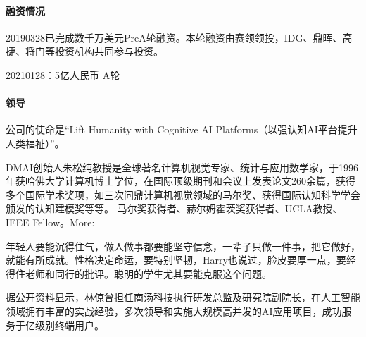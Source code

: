 \documentclass[letterpaper,11pt,english]{sphinxmanual}
\begin{document}
\paragraph{融资情况}
\label{\detokenize{chapter_dive/dm-ai:id5}}

2019\sphinxhyphen{}03\sphinxhyphen{}28已完成数千万美元Pre\sphinxhyphen{}A轮融资。本轮融资由赛领领投，IDG、鼎晖、高捷、将门等投资机构共同参与投资。

2021\sphinxhyphen{}01\sphinxhyphen{}28：5亿人民币 A轮


\paragraph{领导}
\label{\detokenize{chapter_dive/dm-ai:id6}}
公司的使命是“Lift Humanity with Cognitive AI
Platforms（以强认知AI平台提升人类福祉）”。

DMAI创始人朱松纯教授是全球著名计算机视觉专家、统计与应用数学家，于1996年获哈佛大学计算机博士学位，在国际顶级期刊和会议上发表论文260余篇，获得多个国际学术奖项，如三次问鼎计算机视觉领域的马尔奖、获得国际认知科学学会颁发的认知建模奖等等。
马尔奖获得者、赫尔姆霍茨奖获得者、UCLA教授、IEEE
Fellow。More:%
\begin{footnote}[318]\sphinxAtStartFootnote
{}
%
\end{footnote}

年轻人要能沉得住气，做人做事都要能坚守信念，一辈子只做一件事，把它做好，就能有所成就。性格决定命运，要特别坚韧，Harry也说过，脸皮要厚一点，要经得住老师和同行的批评。聪明的学生尤其要能克服这个问题。

据公开资料显示，林倞曾担任商汤科技执行研发总监及研究院副院长，在人工智能领域拥有丰富的实战经验，多次领导和实施大规模高并发的AI应用项目，成功服务于亿级别终端用户。
%
\begin{footnote}[319]\sphinxAtStartFootnote
{}
%
\end{footnote}
\end{document}
